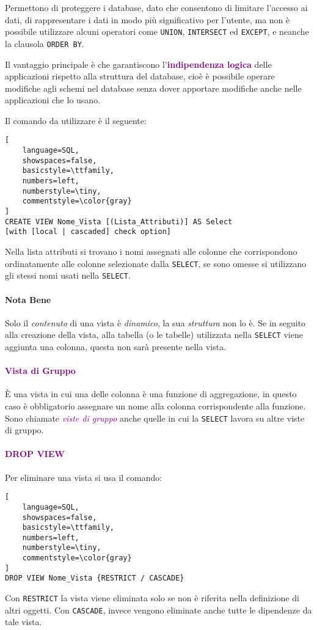 Permettono di proteggere i database, dato che consentono di limitare l'accesso ai dati, di rappresentare
i dati in modo più significativo per l'utente, ma non è possibile utilizzare alcuni operatori come 
\verb|UNION|, \verb|INTERSECT| ed \verb|EXCEPT|, e neanche la clausola \verb|ORDER BY|.

Il vantaggio principale è che garantiscono l'\textbf{\textcolor{purple}{indipendenza logica}} delle
applicazioni rispetto alla struttura del database, cioè è possibile operare modifiche agli schemi
nel database senza dover apportare modifiche anche nelle applicazioni che lo usano.

Il comando da utilizzare è il seguente:
\begin{lstlisting}[
    language=SQL,
    showspaces=false,
    basicstyle=\ttfamily,
    numbers=left,
    numberstyle=\tiny,
    commentstyle=\color{gray}
]
CREATE VIEW Nome_Vista [(Lista_Attributi)] AS Select
[with [local | cascaded] check option]
\end{lstlisting}
Nella lista attributi si trovano i nomi assegnati alle colonne che corrispondono
ordinatamente alle colonne selezionate dalla \verb|SELECT|, se sono omesse si utilizzano gli stessi nomi
usati nella \verb|SELECT|.

\paragraph{Nota Bene} Solo il \emph{contenuto} di una vista è
\emph{dinamico}, la sua \emph{struttura} non lo è. Se in seguito
alla creazione della vista, alla tabella (o le tabelle) utilizzata nella \verb|SELECT|
viene aggiunta una colonna, questa non sarà presente nella vista.

\paragraph{\textcolor{purple}{Vista di Gruppo}} È una vista in cui una delle colonna è una
funzione di aggregazione, in questo caso è obbligatorio assegnare un nome alla colonna corrispondente
alla funzione. Sono chiamate \emph{\textcolor{purple}{viste di gruppo}} anche quelle in cui
la \verb|SELECT| lavora su altre viste di gruppo.

\paragraph{\textcolor{purple}{DROP VIEW}} Per eliminare una vista si usa il comando:
\begin{lstlisting}[
    language=SQL,
    showspaces=false,
    basicstyle=\ttfamily,
    numbers=left,
    numberstyle=\tiny,
    commentstyle=\color{gray}
]
DROP VIEW Nome_Vista {RESTRICT / CASCADE}
\end{lstlisting}
Con \verb|RESTRICT| la vista viene eliminata solo se non è riferita nella definizione di altri oggetti.
Con \verb|CASCADE|, invece vengono eliminate anche tutte le dipendenze da tale vista.

